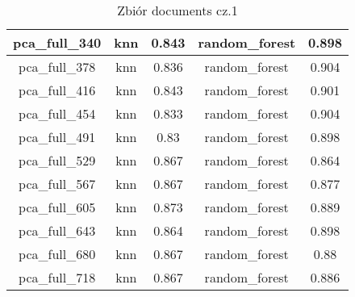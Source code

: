 \documentclass{classrep}
\begin{document}
{{{\begin{table}[!htbp]
\begin{tabular}{|c|c|c|c|c|}
                        pca\_full\_340 & knn & 0.843 & random\_forest & 0.898 \\ \hline
                        pca\_full\_378 & knn & 0.836 & random\_forest & 0.904 \\ \hline
                        pca\_full\_416 & knn & 0.843 & random\_forest & 0.901 \\ \hline
                        pca\_full\_454 & knn & 0.833 & random\_forest & 0.904 \\ \hline
                        pca\_full\_491 & knn & 0.83 & random\_forest & 0.898 \\ \hline
                        pca\_full\_529 & knn & 0.867 & random\_forest & 0.864 \\ \hline
                        pca\_full\_567 & knn & 0.867 & random\_forest & 0.877 \\ \hline
                        pca\_full\_605 & knn & 0.873 & random\_forest & 0.889 \\ \hline
                        pca\_full\_643 & knn & 0.864 & random\_forest & 0.898 \\ \hline
                        pca\_full\_680 & knn & 0.867 & random\_forest & 0.88 \\ \hline
                        pca\_full\_718 & knn & 0.867 & random\_forest & 0.886 \\ \hline
                    \end{tabular}
                    \caption
                    {Zbiór documents cz.1}
                    \label{table_principal_component_analysis_documents_1}
                \end{table}
                \FloatBarrier

}}}
\end{document}
